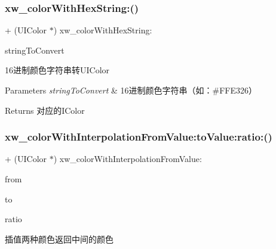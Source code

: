 \subsubsection{\texorpdfstring{xw\+\_\+color\+With\+Hex\+String\+:()}{xw\_colorWithHexString:()}}
{\footnotesize\ttfamily + (U\+I\+Color $\ast$) xw\+\_\+color\+With\+Hex\+String\+: \begin{DoxyParamCaption}\item[{(N\+S\+String $\ast$)}]{string\+To\+Convert }\end{DoxyParamCaption}}

16进制颜色字符串转\+U\+I\+Color


\begin{DoxyParams}{Parameters}
{\em string\+To\+Convert} & 16进制颜色字符串（如：\#\+F\+F\+E326）\\
\hline
\end{DoxyParams}
\begin{DoxyReturn}{Returns}
对应的\+I\+Color 
\end{DoxyReturn}
\mbox{\label{category_u_i_color_07_x_w_add_08_a2877884fce624f702596fd46d31f9fbd}} 
\subsubsection{\texorpdfstring{xw\+\_\+color\+With\+Interpolation\+From\+Value\+:to\+Value\+:ratio\+:()}{xw\_colorWithInterpolationFromValue:toValue:ratio:()}}
{\footnotesize\ttfamily + (U\+I\+Color $\ast$) xw\+\_\+color\+With\+Interpolation\+From\+Value\+: \begin{DoxyParamCaption}\item[{(U\+I\+Color $\ast$)}]{from }\item[{toValue:(U\+I\+Color $\ast$)}]{to }\item[{ratio:(C\+G\+Float)}]{ratio }\end{DoxyParamCaption}}

插值两种颜色返回中间的颜色



